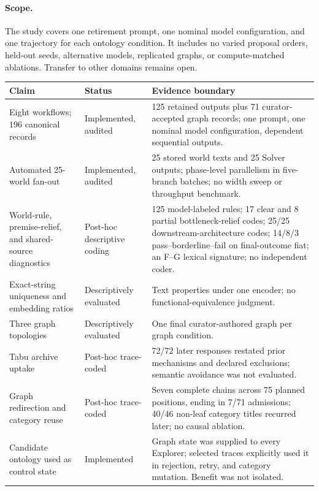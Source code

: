 \documentclass[11pt,a4paper]{article}
\begin{document}
\paragraph{Scope.} The study covers one retirement prompt, one nominal model configuration, and one trajectory for each ontology condition. It includes no varied proposal orders, held-out seeds, alternative models, replicated graphs, or compute-matched ablations. Transfer to other domains remains open.

\begin{table}[htbp]
\centering
\footnotesize
\begin{tabularx}{\textwidth}{>{\raggedright\arraybackslash}p{39mm}>{\raggedright\arraybackslash}p{25mm}X}
\toprule
\textbf{Claim} & \textbf{Status} & \textbf{Evidence boundary} \\
\midrule
Eight workflows; 196 canonical records & Implemented, audited & 125 retained outputs plus 71 curator-accepted graph records; one prompt, one nominal model configuration, dependent sequential outputs. \\
Automated 25-world fan-out & Implemented, audited & 25 stored world texts and 25 Solver outputs; phase-level parallelism in five-branch batches; no width sweep or throughput benchmark. \\
World-rule, premise-relief, and shared-source diagnostics & Post-hoc descriptive coding & 125 model-labeled rules; 17 clear and 8 partial bottleneck-relief codes; 25/25 downstream-architecture codes; 14/8/3 pass--borderline--fail on final-outcome fiat; an F--G lexical signature; no independent coder. \\
Exact-string uniqueness and embedding ratios & Descriptively evaluated & Text properties under one encoder; no functional-equivalence judgment. \\
Three graph topologies & Descriptively evaluated & One final curator-authored graph per graph condition. \\
Tabu archive uptake & Post-hoc trace-coded & 72/72 later responses restated prior mechanisms and declared exclusions; semantic avoidance was not evaluated. \\
Graph redirection and category reuse & Post-hoc trace-coded & Seven complete chains across 75 planned positions, ending in 7/71 admissions; 40/46 non-leaf category titles recurred later; no causal ablation. \\
Candidate ontology used as control state & Implemented & Graph state was supplied to every Explorer; selected traces explicitly used it in rejection, retry, and category mutation. Benefit was not isolated. \\

\end{tabularx}
\end{table}
\end{document}
